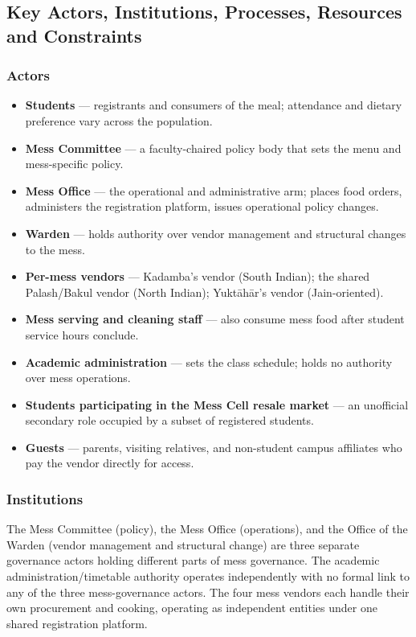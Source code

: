 \documentclass[11pt]{article}
\begin{document}
\subsection{Key Actors, Institutions, Processes, Resources and Constraints}

\subsubsection*{Actors}
\begin{itemize}
    \item \textbf{Students} --- registrants and consumers of the meal; attendance and
        dietary preference vary across the population.
    \item \textbf{Mess Committee} --- a faculty-chaired policy body that sets the menu
        and mess-specific policy.
    \item \textbf{Mess Office} --- the operational and administrative arm; places
        food orders, administers the registration platform, issues operational
        policy changes.
    \item \textbf{Warden} --- holds authority over vendor management and structural
        changes to the mess.
    \item \textbf{Per-mess vendors} --- Kadamba's vendor (South Indian); the shared
        Palash/Bakul vendor (North Indian); Yukt\={a}h\={a}r's vendor (Jain-oriented).
    \item \textbf{Mess serving and cleaning staff} --- also consume mess food after
        student service hours conclude.
    \item \textbf{Academic administration} --- sets the class schedule; holds no
        authority over mess operations.
    \item \textbf{Students participating in the Mess Cell resale market} --- an
        unofficial secondary role occupied by a subset of registered students.
    \item \textbf{Guests} --- parents, visiting relatives, and non-student campus
        affiliates who pay the vendor directly for access.
\end{itemize}

\subsubsection*{Institutions}
The Mess Committee (policy), the Mess Office (operations), and the Office of the
Warden (vendor management and structural change) are three separate governance
actors holding different parts of mess governance. The academic
administration/timetable authority operates independently with no formal link to any
of the three mess-governance actors. The four mess vendors each handle their own
procurement and cooking, operating as independent entities under one shared
registration platform.
\end{document}
